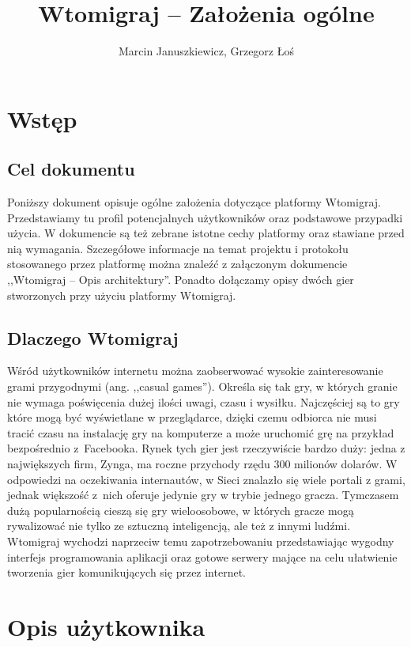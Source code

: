 \documentclass[a4paper, 12pt]{article}
\author{Marcin Januszkiewicz, Grzegorz Łoś}
\title{\textbf{Wtomigraj} -- Założenia ogólne}
\begin{document}

\break

\setcounter{page}{2}

\tableofcontents

\break

\section{Wstęp}

\subsection{Cel dokumentu}
Poniższy dokument opisuje ogólne założenia dotyczące platformy Wtomigraj. Przedstawiamy tu profil potencjalnych użytkowników oraz podstawowe przypadki użycia. W dokumencie są też zebrane istotne cechy platformy oraz stawiane przed nią wymagania. Szczegółowe informacje na temat projektu i protokołu stosowanego przez platformę można znaleźć z załączonym dokumencie ,,Wtomigraj -- Opis architektury''. Ponadto dołączamy opisy dwóch gier stworzonych przy użyciu platformy Wtomigraj.

\subsection{Dlaczego Wtomigraj}
Wśród użytkowników internetu można zaobserwować wysokie zainteresowanie grami przygodnymi (ang. ,,casual games''). Określa się tak gry, w których granie nie wymaga poświęcenia dużej ilości uwagi, czasu i wysiłku. Najczęściej są to gry które mogą być wyświetlane w przeglądarce, dzięki czemu odbiorca nie musi tracić czasu na instalację gry na komputerze a może uruchomić grę na przykład bezpośrednio z~Facebooka. Rynek tych gier jest rzeczywiście bardzo duży: jedna z największych firm, Zynga, ma roczne przychody rzędu 300 milionów dolarów. W odpowiedzi na oczekiwania internautów, w Sieci znalazło się wiele portali z grami, jednak większość z~nich oferuje jedynie gry w trybie jednego gracza. Tymczasem dużą popularnością cieszą się gry wieloosobowe, w których gracze mogą rywalizować nie tylko ze sztuczną inteligencją, ale też z innymi ludźmi. Wtomigraj wychodzi naprzeciw temu zapotrzebowaniu przedstawiając wygodny interfejs programowania aplikacji oraz gotowe serwery mające na celu ułatwienie tworzenia gier komunikujących się przez internet.

\section[Opis użytkownika]{Opis użytkownika}
\end{document}
